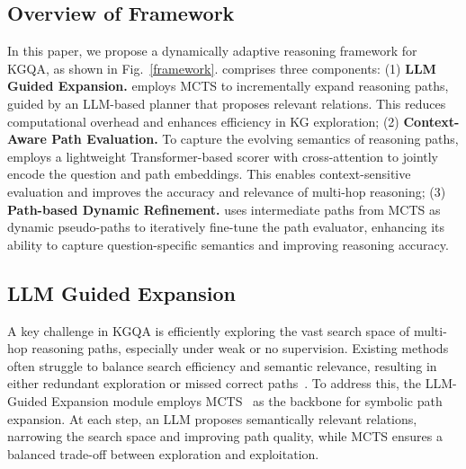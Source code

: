 \subsection{Overview of Framework}
In this paper, we propose a dynamically adaptive reasoning framework \method{} for KGQA, as shown in Fig.~\ref{framework}. 
\method{} comprises three components: (1) \textbf{LLM Guided Expansion.} \method{} employs MCTS to incrementally expand reasoning paths, guided by an LLM-based planner that proposes relevant relations. This reduces computational overhead and enhances efficiency in KG exploration; (2) \textbf{Context-Aware Path Evaluation.} To capture the evolving semantics of reasoning paths, \method{} employs a lightweight Transformer-based scorer with cross-attention to jointly encode the question and path embeddings. This enables context-sensitive evaluation and improves the accuracy and relevance of multi-hop reasoning; (3) \textbf{Path-based Dynamic Refinement.} \method{} uses intermediate paths from MCTS as dynamic pseudo-paths to iteratively fine-tune the path evaluator, enhancing its ability to capture question-specific semantics and improving reasoning accuracy.


\subsection{LLM Guided Expansion}

A key challenge in KGQA is efficiently exploring the vast search space of multi-hop reasoning paths, especially under weak or no supervision. Existing methods often struggle to balance search efficiency and semantic relevance, resulting in either redundant exploration or missed correct paths~\citep{long2025enhancing,li2024simple}. To address this, the LLM-Guided Expansion module employs MCTS~\citep{kocsis2006bandit} as the backbone for symbolic path expansion. At each step, an LLM proposes semantically relevant relations, narrowing the search space and improving path quality, while MCTS ensures a balanced trade-off between exploration and exploitation.


